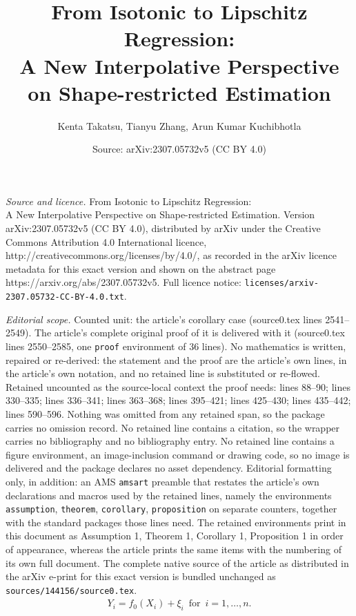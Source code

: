 \documentclass[10pt,a4paper]{amsart}
\title{\Large From Isotonic to Lipschitz Regression:\\ A New Interpolative Perspective on Shape-restricted Estimation}
\author{Kenta Takatsu, Tianyu Zhang, Arun Kumar Kuchibhotla}
\date{Source: arXiv:2307.05732v5 (CC BY 4.0)}
\begin{document}
\maketitle

\noindent\emph{Source and licence.} \Large From Isotonic to Lipschitz Regression:\\ A New Interpolative Perspective on Shape-restricted Estimation. Version arXiv:2307.05732v5 (CC BY 4.0), distributed by arXiv under the Creative Commons Attribution 4.0 International licence, http://creativecommons.org/licenses/by/4.0/, as recorded in the arXiv licence metadata for this exact version and shown on the abstract page https://arxiv.org/abs/2307.05732v5. Full licence notice: \texttt{licenses/arxiv-2307.05732-CC-BY-4.0.txt}.\par\smallskip

\noindent\textit{Editorial scope.} Counted unit: the article's corollary case (source0.tex lines 2541--2549). The article's complete original proof of it is delivered with it (source0.tex lines 2550--2585, one \texttt{proof} environment of 36 lines). No mathematics is written, repaired or re-derived: the statement and the proof are the article's own lines, in the article's own notation, and no retained line is substituted or re-flowed.  Retained uncounted as the source-local context the proof needs: lines 88--90; lines 330--335; lines 336--341; lines 363--368; lines 395--421; lines 425--430; lines 435--442; lines 590--596.  Nothing was omitted from any retained span, so the package carries no omission record.  No retained line contains a citation, so the wrapper carries no bibliography and no bibliography entry.  No retained line contains a figure environment, an image-inclusion command or drawing code, so no image is delivered and the package declares no asset dependency.  Editorial formatting only, in addition: an AMS \texttt{amsart} preamble that restates the article's own declarations and macros used by the retained lines, namely the environments \texttt{assumption}, \texttt{theorem}, \texttt{corollary}, \texttt{proposition} on separate counters, together with the standard packages those lines need.  The retained environments print in this document as Assumption 1, Theorem 1, Corollary 1, Proposition 1 in order of appearance, whereas the article prints the same items with the numbering of its own full document.  The complete native source of the article as distributed in the arXiv e-print for this exact version is bundled unchanged as \texttt{sources/144156/source0.tex}.
\begin{align}\label{eq:regression-function}
    Y_i = f_0(X_i) + \xi_i \, \text{ for }\, i = 1, \dots, n.
\end{align}
\end{document}

